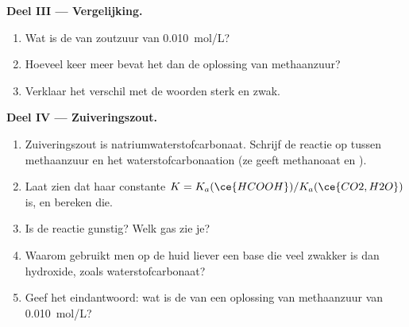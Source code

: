 \begin{problem}
\medskip
\noindent\textbf{Deel III --- Vergelijking.}
\begin{enumerate}[resume]
  \item Wat is de  van zoutzuur van \qty{0.010}{mol/L}?
  \item Hoeveel keer meer  bevat het dan de oplossing van
        methaanzuur?
  \item Verklaar het verschil met de woorden sterk en zwak.
\end{enumerate}

\medskip
\noindent\textbf{Deel IV --- Zuiveringszout.}
\begin{enumerate}[resume]
  \item Zuiveringszout is natriumwaterstofcarbonaat. Schrijf de reactie
        op tussen methaanzuur en het waterstofcarbonaation (ze geeft
        methanoaat en ).
  \item Laat zien dat haar constante $K = K_a(\ce{HCOOH}) / K_a(\ce{CO2,H2O})$
        is, en bereken die.
  \item Is de reactie gunstig? Welk gas zie je?
  \item Waarom gebruikt men op de huid liever een base die veel zwakker is
        dan hydroxide, zoals waterstofcarbonaat?
  \item Geef het eindantwoord: wat is de  van een oplossing van
        methaanzuur van \qty{0.010}{mol/L}?
\end{enumerate}
\end{problem}
